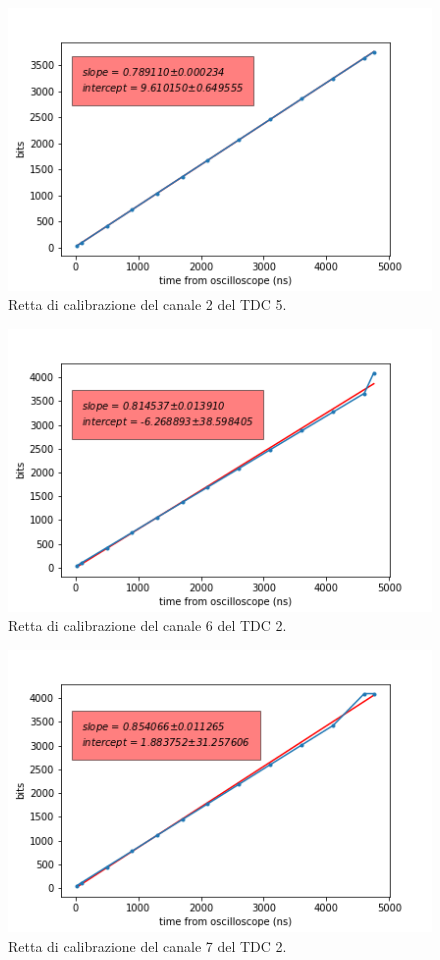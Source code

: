 \begin{figure}[H]
  \centering
  \includegraphics[width=.8\textwidth]{plots/tdc25.png}
  \caption{Retta di calibrazione del canale 2 del TDC 5.}
  \label{fig:tdc25}
\end{figure}

\begin{figure}[H]
  \centering
  \includegraphics[width=.8\textwidth]{plots/tdc26.png}
  \caption{Retta di calibrazione del canale 6 del TDC 2.}
  \label{fig:tdc26}
\end{figure}

\begin{figure}[H]
  \centering
  \includegraphics[width=.8\textwidth]{plots/tdc27.png}
  \caption{Retta di calibrazione del canale 7 del TDC 2.}
  \label{fig:tdc27}
\end{figure}



